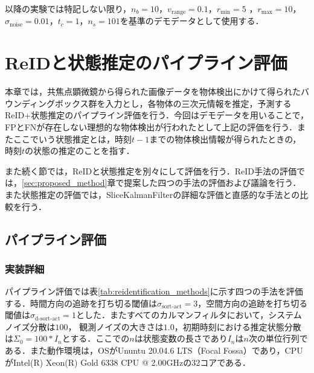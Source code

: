 以降の実験では特記しない限り，$n_b = 10$，$v_{\text{range}} = 0.1$，$r_{\text{min}} = 5$ ，$r_{\text{max}} = 10$，$\sigma_{\text{noise}} = 0.01$，$t_c = 1$，$n_s = 101$を基準のデモデータとして使用する．

\section{ReIDと状態推定のパイプライン評価}
\label{sec:pipeline}

    本章では，共焦点顕微鏡から得られた画像データを物体検出にかけて得られたバウンディングボックス群を入力とし，各物体の三次元情報を推定，予測するReID+状態推定のパイプライン評価を行う．今回はデモデータを用いることで，FPとFNが存在しない理想的な物体検出が行われたとして上記の評価を行う．またここでいう状態推定とは，時刻$t-1$までの物体検出情報が得られたときの，時刻$t$の状態の推定のことを指す．

    また続く節では，ReIDと状態推定を別々にして評価を行う．ReID手法の評価では，\ref{sec:proposed_method}章で提案した四つの手法の評価および議論を行う．また状態推定の評価では，SliceKalmanFilterの詳細な評価と直感的な手法との比較を行う．

    \subsection{パイプライン評価}
    \label{subsec:pipeline_evaluation}

        \subsubsection{実装詳細}
        パイプライン評価では表\ref{tab:reidentification_methods}に示す四つの手法を評価する．時間方向の追跡を打ち切る閾値は$\sigma_{\text{sort-act}} = 3$，空間方向の追跡を打ち切る閾値は$\sigma_{\text{d-sort-act}} = 1$とした．またすべてのカルマンフィルタにおいて，システムノイズ分散は$100$，
        観測ノイズの大きさは$1.0$，初期時刻における推定状態分散は$\Sigma_0 = 100 * I_n$とする．ここでの$n$は状態変数の長さであり$I_n$は$n$次の単位行列である．また動作環境は，OSがUnuntu 20.04.6 LTS（Focal Fossa）であり，CPUがIntel(R) Xeon(R) Gold 6338 CPU @ 2.00GHzの32コアである．

